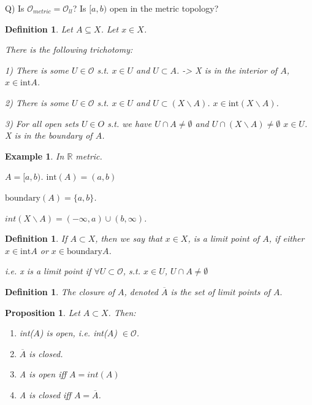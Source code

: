 \documentclass[twoside]{article}
\newcommand{\TO}{\mathcal O}
\newtheorem{proposition}[theorem]{Proposition}
\newtheorem{definition}[theorem]{Definition}
\newtheorem{example}[theorem]{Example}
\newcommand\R{\mathbb{R}}
\begin{document}
    Q) Is $\TO_{metric} = \TO_{ll}$? Is $[a,b)$ open in the metric topology?

    \begin{definition}
        Let $A \subseteq X$. Let $x \in X$. 

        There is the following trichotomy:

        1) There is some $U \in \TO$ s.t. $x \in U$ and $U \subset A$. -> X is in the interior of $A$, $x \in \text{int} A$. 

        2) There is some $U \in \TO$ s.t. $x \in U$ and $U \subset (X \backslash A)$. $x \in \text{int} (X \backslash A)$. 

        3) For all open sets $U \in O$ s.t. 
        we have $U \cap A \neq \emptyset$ and $U \cap (X\backslash A) \neq \emptyset$ $x \in U$. X is in the boundary of $A$.
    \end{definition}

    \begin{example}
        In $\R$ metric. 

        $A = [a,b)$. $\text{int}(A) = (a,b)$

        $\text{boundary}(A) = \{a, b\}$.
        
        $int(X \backslash A) = (-\infty, a) \cup (b, \infty)$. 
    \end{example}

    \begin{definition}
        If $A \subset X$, then we say that $x \in X$, is a limit point of $A$, if either $x \in \text{int} A$ or $x \in \text{boundary} A$. 
        
        i.e. x is a limit point if $\forall U \subset \TO$, s.t. $x \in U$, $U \cap A \neq \emptyset$
    \end{definition}

    \begin{definition}
        The closure of $A$, denoted $\overline A$ is the set of limit points of $A.$
    \end{definition}

    \begin{proposition}
        Let $A \subset X$. Then:

        \begin{enumerate}
            \item int($A$) is open, i.e. int($A$) $\in \TO$.

            \item $\overline A$ is closed. 

            \item A is open iff $A = int(A)$

            \item  A is closed iff $A = \overline A$.
        \end{enumerate}
    \end{proposition}
\end{document}

